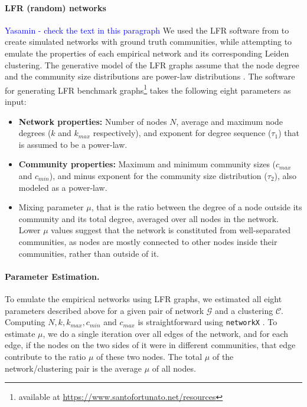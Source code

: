 \documentclass[11pt]{article}   	%
\begin{document}
\paragraph{LFR (random) networks}

\textcolor{blue}{Yasamin - check the text in this paragraph}
We used the LFR software from \cite{lancichinetti2008benchmark} to create simulated networks with ground truth communities, while attempting to emulate the properties of each empirical network and its corresponding Leiden clustering. The generative model of the LFR graphs assume that the node degree and the community size distributions are power-law distributions  \citep{albert2002statistical}.
The software for generating LFR benchmark graphs\footnote{available at \href{https://www.santofortunato.net/resources}{https://www.santofortunato.net/resources}} takes the following eight parameters as input:
\begin{itemize}
    \item  \textbf{Network properties:} Number of nodes $N$, average and maximum node degrees ($k$ and $k_{max}$ respectively), and exponent for degree sequence ($\tau_1$) that is assumed to be a power-law.
    \item \textbf{Community properties:} Maximum and minimum community sizes ($c_{max}$ and $c_{min}$), and minus exponent for the community size distribution ($\tau_2$), also modeled as a power-law.
    \item Mixing parameter $\mu$, that is the ratio between the degree of a node outside its community and its total degree, averaged over all nodes in the network. Lower $\mu$ values suggest that the network is constituted from well-separated communities, as nodes are mostly connected to other nodes inside their communities, rather than outside of it.
\end{itemize}






\paragraph{Parameter Estimation.} To emulate the empirical networks using LFR graphs, we estimated all eight parameters described above for a given pair of network $\mathcal{G}$ and a clustering $\mathcal{C}$. Computing $N, k, k_{max}, c_{min}$ and $c_{max}$ is straightforward using \texttt{networkX} \citep{hagberg2008exploring}. To estimate $\mu$, we do a single iteration over all edges of the network, and for each edge, if the nodes on the two sides of it were in different communities, that edge contribute to the ratio $\mu$ of these two nodes. The total $\mu$ of the network/clustering pair is the average $\mu$ of all nodes.
\end{document}
